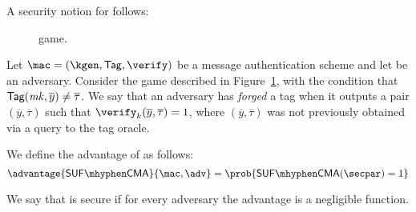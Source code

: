 A security notion for \mac{} follows:

\begin{figure}
    \centering
    \caption{\sufcma{} game.}\label{fig:sufcma}
\end{figure}

\begin{definition}
    Let $\mac = (\kgen,\tagg, \verify)$ be a message authentication scheme and let \adv{} be an adversary. Consider the \sufcma{} game described in Figure~\ref{fig:sufcma}, with the condition that $\mathsf{Tag} (\mathit{mk}, \overline{y}) \neq \overline{\tau}$. We say that an adversary \adv{} has \emph{forged} a tag when it outputs a pair $(\overline{y}, \overline{\tau})$ such that $\verify_k(\overline{y},\overline{\tau}) = 1$, where $(\overline{y},\overline{\tau})$ was not previously obtained via a query to the tag oracle.

    We define the \sufcma{} advantage of \adv{} as follows:
    \[
        \advantage{\sufcma}{\mac, \adv} =  \prob{\sufcma(\secpar) = 1}
    \]

    We say that \mac{} is \sufcma{} secure if for every \ppt{} adversary \adv{} the advantage \advantage{\sufcma}{\mac, \adv} is a negligible function.
\end{definition}
